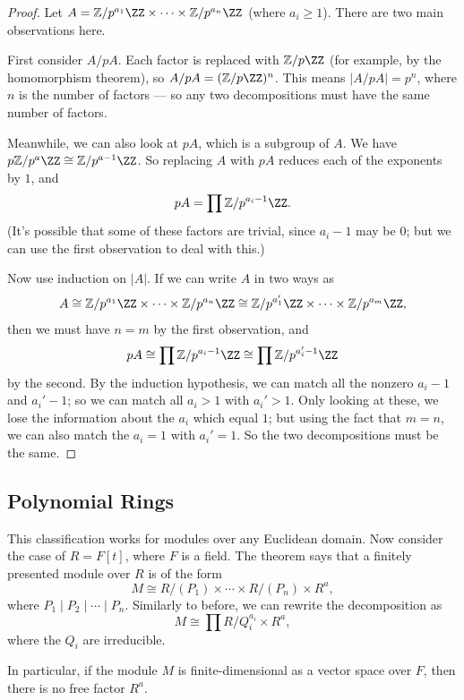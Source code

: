 \begin{proof}
    Let $A = \mathbb{Z}/p^{a_1}\ZZ \times \cdots \times \mathbb{Z}/p^{a_n}\ZZ$ (where $a_i \geq 1$). There are two main observations here. 

    First consider $A/pA$. Each factor is replaced with $\mathbb{Z}/p\ZZ$ (for example, by the homomorphism theorem), so $A/pA = (\mathbb{Z}/p\ZZ)^n$. This means $|A/pA| = p^n$, where $n$ is the number of factors --- so any two decompositions must have the same number of factors. 

    Meanwhile, we can also look at $pA$, which is a subgroup of $A$. We have $p\mathbb{Z}/p^a\ZZ \cong \mathbb{Z}/p^{a - 1}\ZZ$. So replacing $A$ with $pA$ reduces each of the exponents by $1$, and \[pA = \prod \mathbb{Z}/p^{a_i - 1}\ZZ.\] (It's possible that some of these factors are trivial, since $a_i - 1$ may be $0$; but we can use the first observation to deal with this.)

    Now use induction on $|A|$. If we can write $A$ in two ways as \[A \cong \mathbb{Z}/p^{a_1}\ZZ \times \cdots \times \mathbb{Z}/p^{a_n}\ZZ \cong \mathbb{Z}/p^{a_1'}\ZZ \times \cdots \times \mathbb{Z}/p^{a_m}\ZZ,\] then we must have $n = m$ by the first observation, and \[pA \cong \prod \mathbb{Z}/p^{a_i - 1}\ZZ \cong \prod \mathbb{Z}/p^{a_i' - 1}\ZZ\] by the second. By the induction hypothesis, we can match all the nonzero $a_i - 1$ and $a_i' - 1$; so we can match all $a_i > 1$ with $a_i' > 1$. Only looking at these, we lose the information about the $a_i$ which equal $1$; but using the fact that $m = n$, we can also match the $a_i = 1$ with $a_i' = 1$. So the two decompositions must be the same. 
\end{proof}

\subsection{Polynomial Rings}

This classification works for modules over any Euclidean domain. Now consider the case of $R = F[t]$, where $F$ is a field. The theorem says that a finitely presented module over $R$ is of the form \[M \cong R/(P_1) \times \cdots \times R/(P_n) \times R^a,\] where $P_1 \mid P_2 \mid \cdots \mid P_n$. Similarly to before, we can rewrite the decomposition as \[M \cong \prod R/Q_i^{a_i} \times R^a,\] where the $Q_i$ are irreducible. 

In particular, if the module $M$ is finite-dimensional as a vector space over $F$, then there is no free factor $R^a$. 

